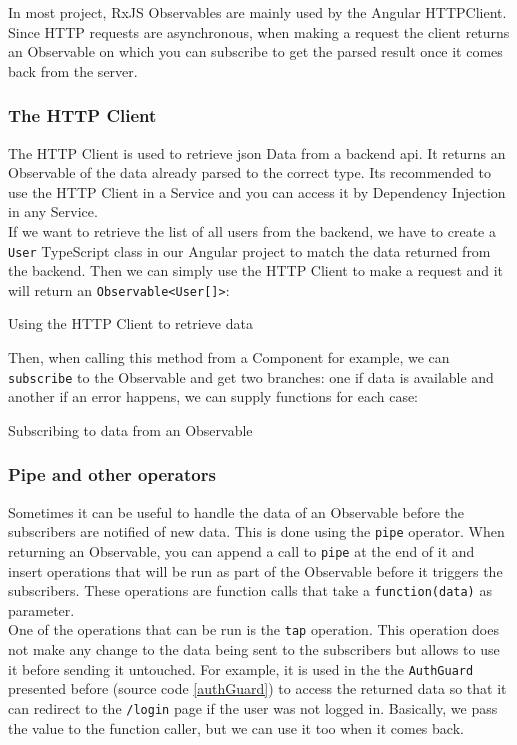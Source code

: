 \documentclass[twoside, openright,11pt,a4paper]{book}
\newenvironment{code}{\captionsetup{type=listing}}{}
\begin{document}
In most project, RxJS Observables are mainly used by the Angular HTTPClient\cite{angular:doc:http}. Since HTTP requests are asynchronous, when making a request the client returns an Observable on which you can subscribe to get the parsed result once it comes back from the server.\\

\subsubsection{The HTTP Client}
The HTTP Client is used to retrieve \gls{json} Data from a backend \gls{api}. It returns an Observable of the data already parsed to the correct type. Its recommended to use the HTTP Client in a Service and you can access it by Dependency Injection in any Service.\\

If we want to retrieve the list of all users from the backend, we have to create a \verb+User+ TypeScript class in our Angular project to match the data returned from the backend. Then we can simply use the HTTP Client to make a request and it will return an \verb+Observable<User[]>+:
\begin{code}
	\caption{Using the HTTP Client to retrieve data}
\end{code}

Then, when calling this method from a Component for example, we can \verb+subscribe+ to the Observable and get two branches: one if data is available and another if an error happens, we can supply functions for each case:
\begin{code}
	\caption{Subscribing to data from an Observable}
\end{code}
\subsubsection{Pipe and other operators}
\label{pipe_operators}
Sometimes it can be useful to handle the data of an Observable before the subscribers are notified of new data. This is done using the \verb+pipe+ operator. When returning an Observable, you can append a call to \verb+pipe+ at the end of it and insert operations that will be run as part of the Observable before it triggers the subscribers. These operations are function calls that take a \verb+function(data)+ as parameter. \\

One of the operations that can be run is the \verb+tap+ operation. This operation does not make any change to the data being sent to the subscribers but allows to use it before sending it untouched. For example, it is used in the the \verb+AuthGuard+ presented before (source code \ref{authGuard}) to access the returned data so that it can redirect to the \verb+/login+ page if the user was not logged in. Basically, we pass the value to the function caller, but we can use it too when it comes back.\\
\end{document}
